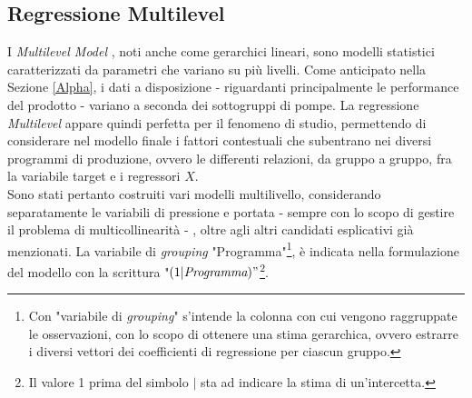 \documentclass[fleqn,10pt]{SelfArx} %
\begin{document}
\subsection{Regressione Multilevel}
I \textit{Multilevel Model} \cite{Multil}\cite{Multil1}, noti anche come gerarchici lineari, sono modelli statistici caratterizzati da parametri che variano su più livelli. Come anticipato nella Sezione \ref{Alpha}, i dati a disposizione - riguardanti principalmente le performance del prodotto - variano a seconda dei sottogruppi di pompe. La regressione \textit{Multilevel} appare quindi perfetta per il fenomeno di studio, permettendo di considerare nel modello finale i fattori contestuali che subentrano nei diversi programmi di produzione, ovvero le differenti relazioni, da gruppo a gruppo, fra la variabile target e i regressori $X$.\\
Sono stati pertanto costruiti vari modelli multilivello, considerando separatamente le variabili di pressione e portata - sempre con lo scopo di gestire il problema di multicollinearità - , oltre agli altri candidati esplicativi già menzionati. La variabile di \textit{grouping} "Programma"\footnote{Con "variabile di \textit{grouping}" s'intende la colonna con cui vengono raggruppate le osservazioni, con lo scopo di ottenere una stima gerarchica, ovvero estrarre i diversi vettori dei coefficienti di regressione per ciascun gruppo.}, è indicata nella formulazione del modello con la scrittura "$(1|\textit{Programma})"$\footnote{Il valore 1 prima del simbolo $\mid$ sta ad indicare la stima di un'intercetta.}. 
\end{document}
